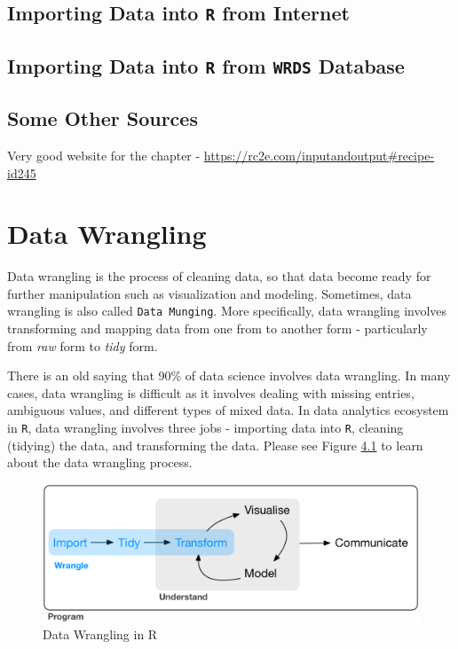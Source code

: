\documentclass[
]{book}
\begin{document}
\hypertarget{importing-data-into-r-from-internet}{%
\section{\texorpdfstring{Importing Data into \texttt{R} from Internet}{Importing Data into R from Internet}}\label{importing-data-into-r-from-internet}}

\hypertarget{importing-data-into-r-from-wrds-database}{%
\section{\texorpdfstring{Importing Data into \texttt{R} from \texttt{WRDS} Database}{Importing Data into R from WRDS Database}}\label{importing-data-into-r-from-wrds-database}}

\hypertarget{some-other-sources}{%
\section{Some Other Sources}\label{some-other-sources}}

Very good website for the chapter - \url{https://rc2e.com/inputandoutput\#recipe-id245}

\hypertarget{data-wrangling}{%
\chapter{Data Wrangling}\label{data-wrangling}}

Data wrangling is the process of cleaning data, so that data become ready for further manipulation such as visualization and modeling. Sometimes, data wrangling is also called \texttt{Data\ Munging}. More specifically, data wrangling involves transforming and mapping data from one from to another form - particularly from \emph{raw} form to \emph{tidy} form.

There is an old saying that 90\% of data science involves data wrangling. In many cases, data wrangling is difficult as it involves dealing with missing entries, ambiguous values, and different types of mixed data. In data analytics ecosystem in \texttt{R}, data wrangling involves three jobs - importing data into \texttt{R}, cleaning (tidying) the data, and transforming the data. Please see Figure \ref{fig:datawrangling} to learn about the data wrangling process.

\begin{figure}

{\centering \includegraphics{images/data-science-wrangle} 

}

\caption{Data Wrangling in R}\label{fig:datawrangling}
\end{figure}
\end{document}
